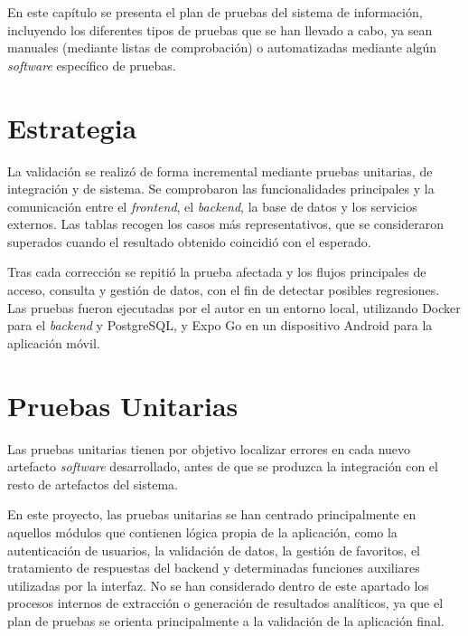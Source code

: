 

En este capítulo se presenta el plan de pruebas del sistema de información, incluyendo los diferentes tipos de pruebas que se han llevado a cabo, ya sean manuales (mediante listas de comprobación) o automatizadas mediante algún \textit{software} específico de pruebas.

\section{Estrategia}

La validación se realizó de forma incremental mediante pruebas unitarias, de
integración y de sistema. Se comprobaron las funcionalidades principales y la
comunicación entre el \textit{frontend}, el \textit{backend}, la base de datos y
los servicios externos. Las tablas recogen los casos más representativos, que se
consideraron superados cuando el resultado obtenido coincidió con el esperado.

Tras cada corrección se repitió la prueba afectada y los flujos principales de
acceso, consulta y gestión de datos, con el fin de detectar posibles regresiones.
Las pruebas fueron ejecutadas por el autor en un entorno local, utilizando
Docker para el \textit{backend} y PostgreSQL, y Expo Go en un dispositivo Android
para la aplicación móvil.

\section{Pruebas Unitarias}

Las pruebas unitarias tienen por objetivo localizar errores en cada nuevo artefacto \textit{software} desarrollado, antes de que se produzca la integración con el resto de artefactos del sistema.

En este proyecto, las pruebas unitarias se han centrado principalmente en aquellos módulos que contienen lógica propia de la aplicación, como la autenticación de usuarios, la validación de datos, la gestión de favoritos, el tratamiento de respuestas del backend y determinadas funciones auxiliares utilizadas por la interfaz. No se han considerado dentro de este apartado los procesos internos de extracción o generación de resultados analíticos, ya que el plan de pruebas se orienta principalmente a la validación de la aplicación final.

